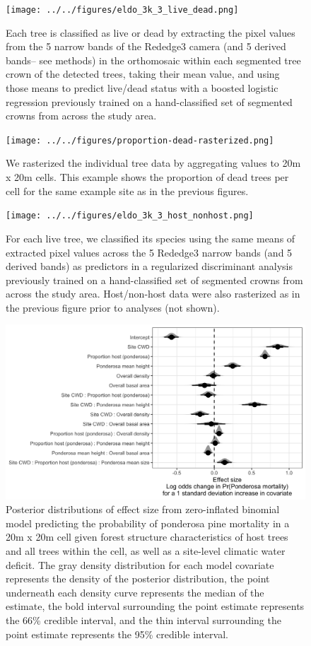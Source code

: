 \documentclass[]{article}
\begin{document}
\begin{figure}
\centering
\texttt{[image: ../../figures/eldo\_3k\_3\_live\_dead.png]}
\caption{Each tree is classified as live or dead by extracting the pixel
values from the 5 narrow bands of the Rededge3 camera (and 5 derived
bands-- see methods) in the orthomosaic within each segmented tree crown
of the detected trees, taking their mean value, and using those means to
predict live/dead status with a boosted logistic regression previously
trained on a hand-classified set of segmented crowns from across the
study area.}
\end{figure}

\begin{figure}
\centering
\texttt{[image: ../../figures/proportion-dead-rasterized.png]}
\caption{We rasterized the individual tree data by aggregating values to
20m x 20m cells. This example shows the proportion of dead trees per
cell for the same example site as in the previous figures.}
\end{figure}

\begin{figure}
\centering
\texttt{[image: ../../figures/eldo\_3k\_3\_host\_nonhost.png]}
\caption{For each live tree, we classified its species using the same
means of extracted pixel values across the 5 Rededge3 narrow bands (and
5 derived bands) as predictors in a regularized discriminant analysis
previously trained on a hand-classified set of segmented crowns from
across the study area. Host/non-host data were also rasterized as in the
previous figure prior to analyses (not shown).}
\end{figure}

\begin{figure}
\centering
\includegraphics{../../figures/effect-sizes-halfeye.png}
\caption{Posterior distributions of effect size from zero-inflated
binomial model predicting the probability of ponderosa pine mortality in
a 20m x 20m cell given forest structure characteristics of host trees
and all trees within the cell, as well as a site-level climatic water
deficit. The gray density distribution for each model covariate
represents the density of the posterior distribution, the point
underneath each density curve represents the median of the estimate, the
bold interval surrounding the point estimate represents the 66\%
credible interval, and the thin interval surrounding the point estimate
represents the 95\% credible interval.}
\end{figure}
\end{document}
